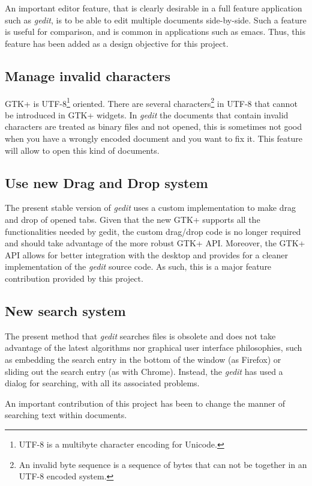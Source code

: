 An important editor feature, that is clearly desirable in a full feature application 
such as \emph{gedit}, is to be able to edit multiple documents side-by-side. 
Such a feature is useful for comparison, and is common in applications such as emacs. 
Thus, this feature has been added as a design objective for this project.


\subsection{Manage invalid characters}\label{sec:InvalidChars}



GTK+ is UTF-8\footnote{UTF-8 is a multibyte character encoding for Unicode.} oriented. There 
are several characters\footnote{An invalid byte sequence is a sequence of bytes that can not be 
together in an UTF-8 encoded system.} in UTF-8 that cannot be introduced in GTK+ widgets. 
In \emph{gedit} the documents that contain invalid characters are treated as binary files and not 
opened, this is sometimes not good when you have a wrongly encoded document and you want to fix it. 
This feature will allow to open this kind of documents.

\subsection{Use new Drag and Drop system}\label{sec:DND}

The present stable version of \emph{gedit} uses a custom implementation to make 
drag and drop of opened tabs.  Given that the new GTK+ supports all the functionalities 
needed by gedit, the custom drag/drop code is no longer required and should take advantage
of the more robust GTK+ API.  Moreover, the GTK+ API allows for better integration 
with the desktop and provides for a cleaner implementation of the \emph{gedit} source code.
As such, this is a major feature contribution provided by this project. 

\subsection{New search system}\label{sec:SearchSystem}

The present method that \emph{gedit} searches files is obsolete and does not take advantage of 
the latest algorithms nor graphical user interface philosophies, such as embedding the search 
entry in the bottom of the window (as Firefox) or sliding out the search entry (as with Chrome). 
Instead, the \emph{gedit} has used a dialog for searching, with all its associated problems. 

An important contribution of this project has been to change the manner of searching text 
within documents.
